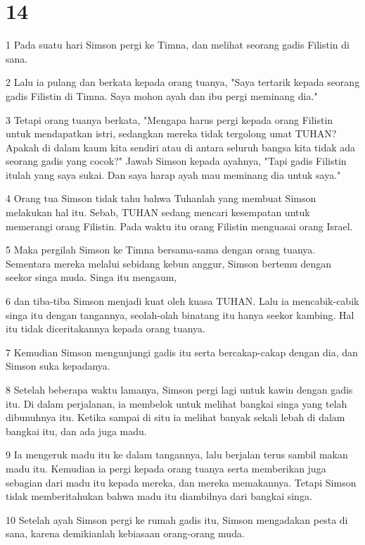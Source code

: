 \chapter{14}

\par 1 Pada suatu hari Simson pergi ke Timna, dan melihat seorang gadis Filistin di sana.
\par 2 Lalu ia pulang dan berkata kepada orang tuanya, "Saya tertarik kepada seorang gadis Filistin di Timna. Saya mohon ayah dan ibu pergi meminang dia."
\par 3 Tetapi orang tuanya berkata, "Mengapa harus pergi kepada orang Filistin untuk mendapatkan istri, sedangkan mereka tidak tergolong umat TUHAN? Apakah di dalam kaum kita sendiri atau di antara seluruh bangsa kita tidak ada seorang gadis yang cocok?" Jawab Simson kepada ayahnya, "Tapi gadis Filistin itulah yang saya sukai. Dan saya harap ayah mau meminang dia untuk saya."
\par 4 Orang tua Simson tidak tahu bahwa Tuhanlah yang membuat Simson melakukan hal itu. Sebab, TUHAN sedang mencari kesempatan untuk memerangi orang Filistin. Pada waktu itu orang Filistin menguasai orang Israel.
\par 5 Maka pergilah Simson ke Timna bersama-sama dengan orang tuanya. Sementara mereka melalui sebidang kebun anggur, Simson bertemu dengan seekor singa muda. Singa itu mengaum,
\par 6 dan tiba-tiba Simson menjadi kuat oleh kuasa TUHAN. Lalu ia mencabik-cabik singa itu dengan tangannya, seolah-olah binatang itu hanya seekor kambing. Hal itu tidak diceritakannya kepada orang tuanya.
\par 7 Kemudian Simson mengunjungi gadis itu serta bercakap-cakap dengan dia, dan Simson suka kepadanya.
\par 8 Setelah beberapa waktu lamanya, Simson pergi lagi untuk kawin dengan gadis itu. Di dalam perjalanan, ia membelok untuk melihat bangkai singa yang telah dibunuhnya itu. Ketika sampai di situ ia melihat banyak sekali lebah di dalam bangkai itu, dan ada juga madu.
\par 9 Ia mengeruk madu itu ke dalam tangannya, lalu berjalan terus sambil makan madu itu. Kemudian ia pergi kepada orang tuanya serta memberikan juga sebagian dari madu itu kepada mereka, dan mereka memakannya. Tetapi Simson tidak memberitahukan bahwa madu itu diambilnya dari bangkai singa.
\par 10 Setelah ayah Simson pergi ke rumah gadis itu, Simson mengadakan pesta di sana, karena demikianlah kebiasaan orang-orang muda.

